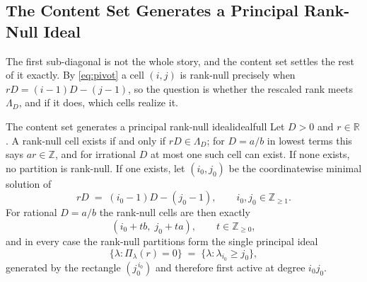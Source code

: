\documentclass[11pt,letterpaper]{article}
\newcommand{\Zint}{\mathbb{Z}}
\newcommand{\Rr}{\mathbb{R}}
\begin{document}
\subsection{The Content Set Generates a Principal Rank-Null Ideal}
The first sub-diagonal is not the whole story, and the content set settles the
rest of it exactly. By \eqref{eq:pivot} a cell $(i,j)$ is rank-null precisely
when $rD=(i-1)D-(j-1)$, so the question is whether the rescaled rank meets
$\Lambda_D$, and if it does, which cells realize it.

\begin{proposition}{The content set generates a principal rank-null ideal}{idealfull}
Let $D>0$ and $r\in\Rr$. A rank-null cell exists if and only if
$rD\in\Lambda_D$; for $D=a/b$ in lowest terms this says $ar\in\Zint$, and for
irrational $D$ at most one such cell can exist. If none exists, no partition is
rank-null. If one exists, let $(i_0,j_0)$ be the coordinatewise minimal solution
of
\begin{equation}
  rD\;=\;(i_0-1)D-(j_0-1),\qquad i_0,j_0\in\Zint_{\ge1}.
  \label{eq:idealmin}
\end{equation}
For rational $D=a/b$ the rank-null cells are then exactly
\begin{equation}
  (i_0+tb,\;j_0+ta),\qquad t\in\Zint_{\ge0},
  \label{eq:idealprog}
\end{equation}
and in every case the rank-null partitions form the single principal ideal
\begin{equation}
  \bigl\{\lambda:\Pi_\lambda(r)=0\bigr\}\;=\;\bigl\{\lambda:\lambda_{i_0}\ge j_0\bigr\},
  \label{eq:idealprincipal}
\end{equation}
generated by the rectangle $(j_0^{\,i_0})$ and therefore first active at degree
$i_0j_0$.
\end{proposition}
\end{document}
